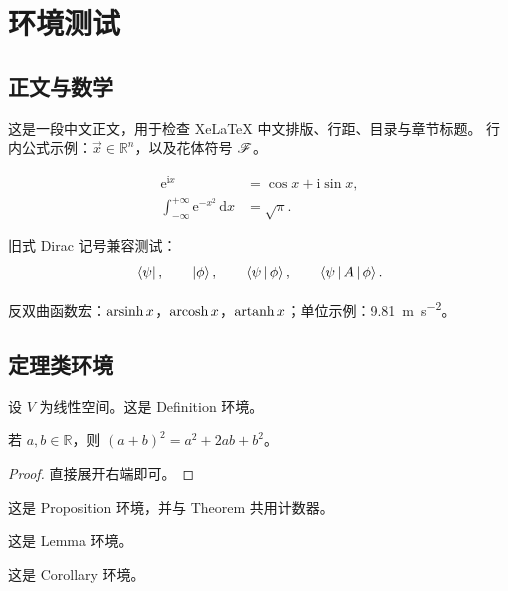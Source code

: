 \chapter{环境测试}

\section{正文与数学}

这是一段中文正文，用于检查 XeLaTeX 中文排版、行距、目录与章节标题。
行内公式示例：$\vec{x}\in\mathbb{R}^n$，以及花体符号 $\mathscr{F}$。

\begin{align}
  \mathrm{e}^{\mathrm{i}x} &= \cos x + \mathrm{i}\sin x, \\
  \int_{-\infty}^{+\infty} \mathrm{e}^{-x^2}\,\mathrm{d}x &= \sqrt{\pi}.
\end{align}

旧式 Dirac 记号兼容测试：
\[
  \Bra{\psi},\qquad
  \Ket{\phi},\qquad
  \Braket{\psi|\phi},\qquad
  \Braket{\psi|A|\phi}.
\]

反双曲函数宏：$\operatorname{arsinh} x$，$\operatorname{arcosh} x$，$\operatorname{artanh} x$；单位示例：\SI{9.81}{\metre\per\second\squared}。

\section{定理类环境}

\begin{definition}[测试定义]\label{def:test}
设 $V$ 为线性空间。这是 Definition 环境。
\end{definition}

\begin{theorem}[测试定理]\label{thm:test}
若 $a,b\in\mathbb{R}$，则 $(a+b)^2=a^2+2ab+b^2$。
\end{theorem}

\begin{proof}
直接展开右端即可。
\end{proof}

\begin{proposition}[测试命题]
这是 Proposition 环境，并与 Theorem 共用计数器。
\end{proposition}

\begin{lemma}[测试引理]
这是 Lemma 环境。
\end{lemma}

\begin{corollary}[测试推论]
这是 Corollary 环境。
\end{corollary}

